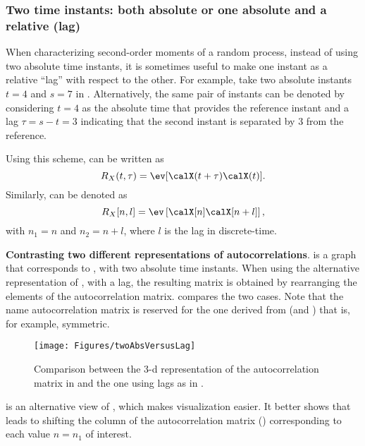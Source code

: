 \subsubsection{Two time instants: both absolute or one absolute and a relative (lag)}

When characterizing second-order moments of a random process, instead of using two
absolute time instants, it is sometimes useful to make one instant as a relative ``lag''
with respect to the other. For example, take two absolute instants $t=4$ and $s=7$ in . Alternatively, the same pair of instants can be denoted by 
considering $t=4$ as the absolute time that provides the reference instant and a 
lag $\tau=s-t=3$ indicating that the second instant is separated by 3 from the reference.

Using this scheme,  can be written as
\begin{equation}
R_{X}(t,\tau) = \ev[\calX(t+\tau) \calX(t)].
\label{eq:autocorrelation2}
\end{equation}
Similarly,  can be denoted as
\begin{equation}
R_X[n,l] = \ev \left[\calX[n] \calX[n+l] \right],
\label{eq:discreteTimeCorrelation}
\end{equation}
with $n_1 = n$ and $n_2=n+l$, where $l$ is the lag in discrete-time.

\bExample \textbf{Contrasting two different representations of autocorrelations}.
 is a graph that corresponds to , with two absolute time instants.
When using the alternative representation of , with a lag, the
resulting matrix is obtained by rearranging the elements of the autocorrelation matrix.
 compares the two cases.
Note that the name autocorrelation matrix is reserved for the one derived from
 (and ) that is, for example, symmetric.

\begin{figure}[htbp]
\centering
\texttt{[image: Figures/twoAbsVersusLag]}
\caption{Comparison between the 3-d representation of the autocorrelation matrix in  and
the one using lags as in .\label{fig:twoAbsVersusLag}}
\end{figure}

 is an alternative view of , which
makes visualization easier. It better shows that 
leads to shifting the column of the autocorrelation matrix () corresponding to each 
value $n=n_1$ of interest.

